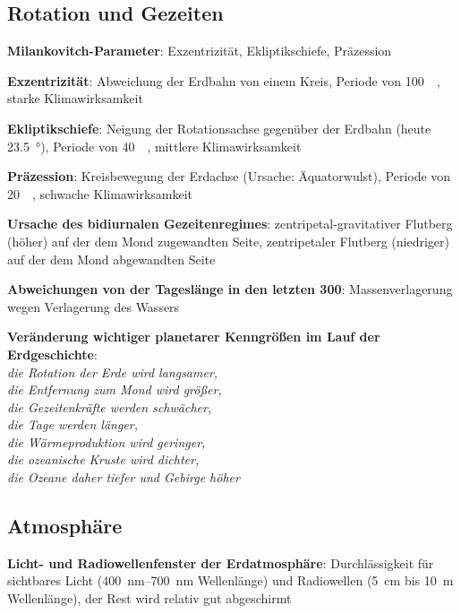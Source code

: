 \pagebreak

\subsection{%
    Rotation und Gezeiten%
}

\textbf{Milankovitch-Parameter}:
Exzentrizität,
Ekliptikschiefe,
Präzession

\textbf{Exzentrizität}:
Abweichung der Erdbahn von einem Kreis,
Periode von \SI{100}{\kilo\year},
starke Klimawirksamkeit

\textbf{Ekliptikschiefe}:
Neigung der Rotationsachse gegenüber der Erdbahn
(heute \SI{23.5}{\degree}),
Periode von \SI{40}{\kilo\year},
mittlere Klimawirksamkeit

\textbf{Präzession}:
Kreisbewegung der Erdachse
(Ursache: Äquatorwulst),
Periode von \SI{20}{\kilo\year},
schwache Klimawirksamkeit

\textbf{Ursache des bidiurnalen Gezeitenregimes}:
zentripetal-gravitativer Flutberg (höher) auf der dem Mond zugewandten Seite,
zentripetaler Flutberg (niedriger) auf der dem Mond abgewandten Seite

\textbf{Abweichungen von der Tageslänge in den letzten \SI{300}{\year}}:
Massenverlagerung wegen Verlagerung des Wassers

\begin{wichtig}
    \item
    \textbf{Veränderung wichtiger planetarer Kenngrößen im Lauf der Erdgeschichte}:\\
    \emph{die Rotation der Erde wird langsamer,\\
    die Entfernung zum Mond wird größer,\\
    die Gezeitenkräfte werden schwächer,\\
    die Tage werden länger,\\
    die Wärmeproduktion wird geringer,\\
    die ozeanische Kruste wird dichter,\\
    die Ozeane daher tiefer und Gebirge höher}
\end{wichtig}

\pagebreak

\subsection{%
    Atmosphäre%
}

\textbf{Licht- und Radiowellenfenster der Erdatmosphäre}:
Durchlässigkeit für sichtbares Licht (\SIrange{400}{700}{\nano\meter} Wellenlänge)
und Radiowellen (\SI{5}{\centi\meter} bis \SI{10}{\meter} Wellenlänge),
der Rest wird relativ gut abgeschirmt

